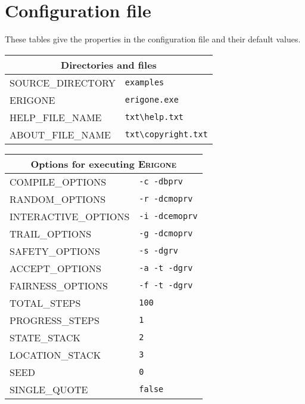 \documentclass[11pt]{article}
\newcommand{\eri}{\textsc{Erigone}}
\begin{document}
\appendix

\section{Configuration file}\label{a.cfg}

These tables give the properties in the configuration file and their
default values.

\begin{center}

\begin{tabular}{|p{}|p{}|}
\hline
\multicolumn{2}{|c|}{Directories and files}\\ \hline
\textsc{\ttfamily SOURCE\_DIRECTORY} & \verb+examples+ \\
\textsc{\ttfamily ERIGONE} &\verb+erigone.exe+ \\
\textsc{\ttfamily HELP\_FILE\_NAME} &\verb+txt\help.txt+\\
\textsc{\ttfamily ABOUT\_FILE\_NAME} &\verb+txt\copyright.txt+\\
\hline
\end{tabular}

\bigskip

\begin{tabular}{|p{}|p{}|}
\hline
\multicolumn{2}{|c|}{Options for executing \eri{}}\\ \hline
\textsc{\ttfamily COMPILE\_OPTIONS} &\verb+-c -dbprv+\\
\textsc{\ttfamily RANDOM\_OPTIONS} &\verb+-r -dcmoprv+\\
\textsc{\ttfamily INTERACTIVE\_OPTIONS} &\verb+-i -dcemoprv+\\
\textsc{\ttfamily TRAIL\_OPTIONS} &\verb+-g -dcmoprv+\\
\textsc{\ttfamily SAFETY\_OPTIONS} &\verb+-s -dgrv+\\
\textsc{\ttfamily ACCEPT\_OPTIONS} &\verb+-a -t -dgrv+\\
\textsc{\ttfamily FAIRNESS\_OPTIONS} &\verb+-f -t -dgrv+\\
\hline\hline
\textsc{\ttfamily TOTAL\_STEPS} & \verb+100+\\
\textsc{\ttfamily PROGRESS\_STEPS} & \verb+1+\\
\textsc{\ttfamily STATE\_STACK} & \verb+2+\\
\textsc{\ttfamily LOCATION\_STACK} & \verb+3+\\
\textsc{\ttfamily SEED} & \verb+0+\\
\textsc{\ttfamily SINGLE\_QUOTE} & \verb+false+\\\hline
\end{tabular}


\end{center}
\end{document}
